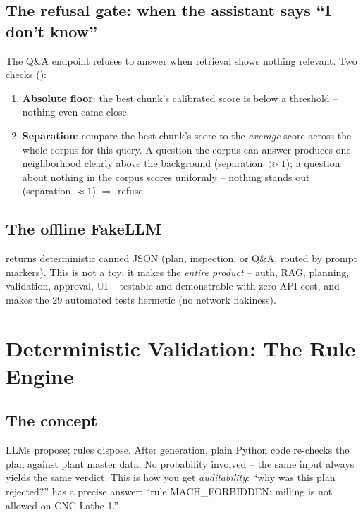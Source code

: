 \subsection{The refusal gate: when the assistant says ``I don't know''}
\label{sec:refusal}
The Q\&A endpoint refuses to answer when retrieval shows nothing relevant. Two checks
():
\begin{enumerate}[nosep]
  \item \textbf{Absolute floor}: the best chunk's calibrated score is below a
        threshold -- nothing even came close.
  \item \textbf{Separation}: compare the best chunk's score to the \emph{average}
        score across the whole corpus for this query. A question the corpus can
        answer produces one neighborhood clearly above the background (separation
        $\gg 1$); a question about nothing in the corpus scores uniformly -- nothing
        stands out (separation $\approx 1$) $\Rightarrow$ refuse.
\end{enumerate}

\subsection{The offline FakeLLM}
 returns deterministic canned JSON (plan, inspection, or Q\&A,
routed by prompt markers). This is not a toy: it makes the \emph{entire product} --
auth, RAG, planning, validation, approval, UI -- testable and demonstrable with zero
API cost, and makes the 29 automated tests hermetic (no network flakiness).

\section{Deterministic Validation: The Rule Engine}\label{sec:rules}

\subsection{The concept}
LLMs propose; rules dispose. After generation, plain Python code re-checks the plan
against plant master data. No probability involved -- the same input always yields the
same verdict. This is how you get \emph{auditability}: ``why was this plan rejected?''
has a precise answer: ``rule MACH\_FORBIDDEN: milling is not allowed on CNC Lathe-1.''

